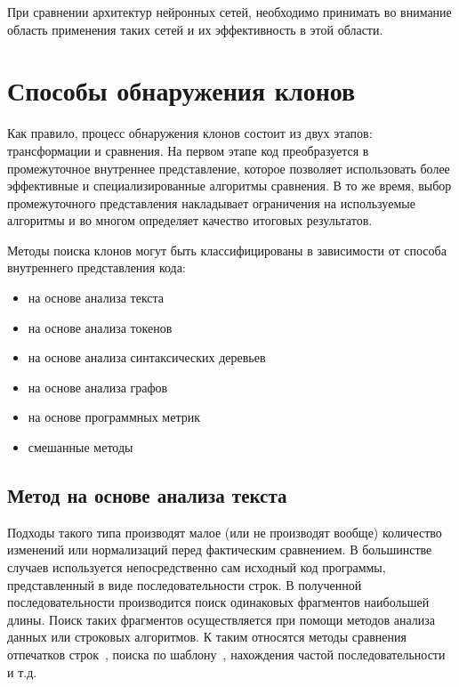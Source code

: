 При сравнении архитектур нейронных сетей, необходимо принимать во внимание область применения таких сетей и их эффективность в этой области.

\section{Способы обнаружения клонов}

Как правило, процесс обнаружения клонов состоит из двух этапов: трансформации и сравнения. На первом этапе код преобразуется в промежуточное внутреннее представление, которое позволяет использовать более эффективные и специализированные алгоритмы сравнения. В то же время, выбор промежуточного представления накладывает ограничения на используемые алгоритмы и во многом определяет качество итоговых результатов.

Методы поиска клонов могут быть классифицированы в зависимости от способа внутреннего представления кода:
\begin{itemize}
\setlength\itemsep{0mm}
\item на основе анализа текста
\item на основе анализа токенов
\item на основе анализа синтаксических деревьев
\item на основе анализа графов
\item на основе программных метрик
\item смешанные методы
\end{itemize}

\subsection{Метод на основе анализа текста}

Подходы такого типа производят малое (или не производят вообще) количество изменений или нормализаций перед фактическим сравнением. В большинстве случаев используется непосредственно сам исходный код программы, представленный в виде последовательности строк. В полученной последовательности производится поиск одинаковых фрагментов наибольшей длины. Поиск таких фрагментов осуществляется при помощи методов анализа данных или строковых алгоритмов. К таким относятся методы сравнения отпечатков строк~\cite{fingerprints}, поиска по шаблону~\cite{templates2}, нахождения частой последовательности~\cite{sequence} и т.д.

